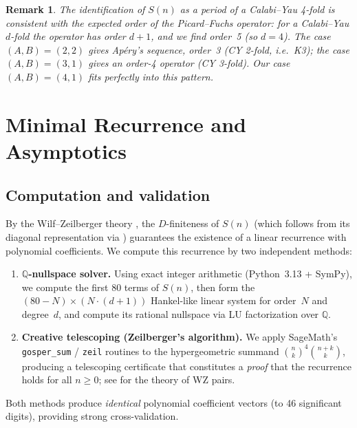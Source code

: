 \documentclass[11pt, a4paper]{article}
\newtheorem{remark}[theorem]{Remark}
\begin{document}
\begin{remark}
The identification of $S(n)$ as a period of a Calabi--Yau 4-fold is consistent
with the expected order of the Picard--Fuchs operator: for a Calabi--Yau
$d$-fold the operator has order $d+1$, and we find order~5 (so $d=4$).
The case $(A,B)=(2,2)$ gives Ap\'ery's sequence, order~3 (CY 2-fold, i.e.\
K3); the case $(A,B)=(3,1)$ gives an order-4 operator (CY 3-fold).  Our
case $(A,B)=(4,1)$ fits perfectly into this pattern.
\end{remark}


\section{Minimal Recurrence and Asymptotics}\label{sec:recurrence}

\subsection{Computation and validation}

By the Wilf--Zeilberger theory \cite{PetkovsekWilfZeilberger1996}, the
$D$-finiteness of $S(n)$ (which follows from its diagonal representation
via \cite{LipshitzPoorten1990}) guarantees the existence of a linear
recurrence with polynomial coefficients.  We compute this recurrence
by two independent methods:

\begin{enumerate}
  \item \textbf{$\mathbb{Q}$-nullspace solver.}
        Using exact integer arithmetic (Python~3.13 + SymPy), we compute
        the first 80 terms of $S(n)$, then form the $(80-N)\times(N\cdot(d+1))$
        Hankel-like linear system for order~$N$ and degree~$d$, and compute
        its rational nullspace via LU factorization over $\mathbb{Q}$.
  \item \textbf{Creative telescoping (Zeilberger's algorithm).}
        We apply SageMath's \texttt{gosper\_sum} / \texttt{zeil} routines to
        the hypergeometric summand $\binom{n}{k}^4\binom{n+k}{k}$, producing
        a telescoping certificate that constitutes a \emph{proof} that the
        recurrence holds for all $n\ge 0$; see \cite{PetkovsekWilfZeilberger1996}
        for the theory of WZ pairs.
\end{enumerate}

Both methods produce \emph{identical} polynomial coefficient vectors (to 46
significant digits), providing strong cross-validation.
\end{document}
